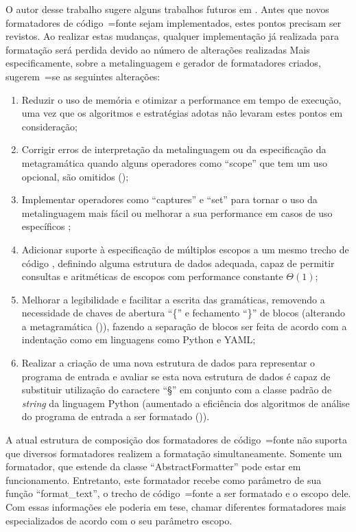 O autor desse trabalho sugere alguns trabalhos futuros em .
Antes que novos formatadores de código~=fonte sejam implementados,
estes pontos precisam ser revistos.
Ao realizar estas mudanças,
qualquer implementação já realizada para formatação será perdida devido ao número de alterações realizadas Mais especificamente,
sobre a metalinguagem e
gerador de formatadores criados,
sugerem~=se as seguintes alterações:
\begin{enumerate}
\item Reduzir o uso de memória e
otimizar a performance em tempo de execução,
uma vez que os algoritmos e
estratégias adotas não levaram estes pontos em consideração;
\item Corrigir erros de interpretação da metalinguagem ou
da especificação da metagramática quando alguns operadores como ``scope'' que tem um uso opcional,
são omitidos ();
\item Implementar operadores como ``captures'' e
``set'' para tornar o uso da metalinguagem mais fácil ou
melhorar a sua performance em casos de uso específicos \cite{sublimeTextSyntax};
\item Adicionar suporte à especificação de múltiplos escopos a um mesmo trecho de código \cite{vsCodeSyntaxHighlighthing},
definindo alguma estrutura de dados adequada,
capaz de permitir consultas e
aritméticas de escopos \cite{textMateScopeExclusion} com performance constante $\Theta(1)$;
\item Melhorar a legibilidade e
facilitar a escrita das gramáticas,
removendo a necessidade de chaves de abertura ``\{'' e
fechamento ``\}'' de blocos (alterando a metagramática ()),
fazendo a separação de blocos ser feita de acordo com a indentação como em linguagens como Python e
YAML;
\item Realizar a criação de uma nova estrutura de dados para representar o programa de entrada e
avaliar se esta nova estrutura de dados é capaz de substituir utilização do caractere ``§'' em conjunto com a classe padrão de \textit{string} da linguagem Python (aumentado a eficiência dos algoritmos de análise do programa de entrada a ser formatado ()).
\end{enumerate}%

A atual estrutura de composição dos formatadores de código~=fonte não suporta que diversos formatadores realizem a formatação simultaneamente.
Somente um formatador,
que estende da classe ``AbstractFormatter'' pode estar em funcionamento.
Entretanto,
este formatador recebe como parâmetro de sua função ``format\_text'',
o trecho de código~=fonte a ser formatado e
o escopo dele.
Com essas informações ele poderia em tese,
chamar diferentes formatadores mais especializados de acordo com o seu parâmetro escopo.

